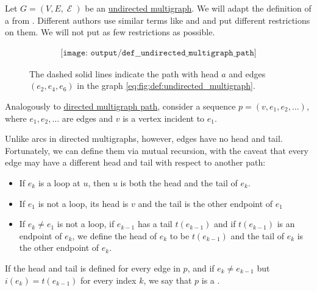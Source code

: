 \begin{definition}\label{def:undirected_multigraph_path}
  Let \( G = (V, E, \mscrE) \) be an \hyperref[def:undirected_multigraph]{undirected multigraph}. We will adapt the definition of a  from . Different authors use similar terms like  and  and put different restrictions on them. We will not put as few restrictions as possible.

  \begin{figure}[!ht]
    \begin{equation}\label{eq:fig:def:undirected_multigraph_path}
      \begin{aligned}
        \texttt{[image: output/def\_\_undirected\_multigraph\_path]}
      \end{aligned}
    \end{equation}
    \caption{The dashed solid lines indicate the path with head \( a \) and edges \( (e_2, e_4, e_6) \) in the graph \eqref{eq:fig:def:undirected_multigraph}.}\label{fig:def:undirected_multigraph_path}
  \end{figure}

  Analogously to \hyperref[def:graph_walk/path]{directed multigraph path}, consider a sequence \( p = (v, e_1, e_2, \ldots) \), where \( e_1, e_2, \ldots \) are edges and \( v \) is a vertex incident to \( e_1 \).

  Unlike arcs in directed multigraphs, however, edges have no head and tail. Fortunately, we can define them via mutual recursion, with the caveat that every edge may have a different head and tail with respect to another path:
  \begin{itemize}
    \item If \( e_k \) is a loop at \( u \), then \( u \) is both the head and the tail of \( e_k \).
    \item If \( e_1 \) is not a loop, its head is \( v \) and the tail is the other endpoint of \( e_1 \)
    \item If \( e_k \neq e_1 \) is not a loop, if \( e_{k-1} \) has a tail \( t(e_{k-1}) \) and if \( t(e_{k-1}) \) is an endpoint of \( e_k \), we define the head of \( e_k \) to be \( t(e_{k-1}) \) and the tail of \( e_k \) is the other endpoint of \( e_k \).
  \end{itemize}

  If the head and tail is defined for every edge in \( p \), and if \( e_k \neq e_{k-1} \) but \( i(e_k) = t(e_{k-1}) \) for every index \( k \), we say that \( p \) is a .


\end{definition}
